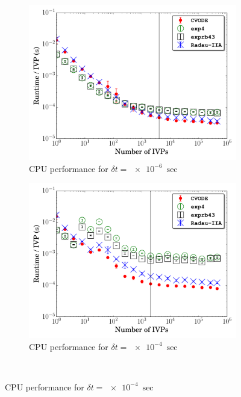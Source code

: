\documentclass[final,twocolumn]{elsarticle}
\begin{document}
\begin{figure}[htb]
  \ifmeasure
  \fontsize{8pt}{10pt}\selectfont
  \fi
  \centering
  \begin{subfigure}{0.49\textwidth}
      \includegraphics[width=\linewidth]{CH4_1e-06_cpu.pdf}
      \caption{CPU performance for $\delta t = \SI{e-6}{\sec}$}
      \label{F:ch4_cpu_perf_small}
  \end{subfigure}
  \begin{subfigure}{0.49\textwidth}
      \includegraphics[width=\linewidth]{CH4_1e-04_cpu.pdf}
      \caption{CPU performance for $\delta t = \SI{e-4}{\sec}$}
      \label{F:ch4_cpu_perf_large}
  \end{subfigure}\\

\end{figure}
\end{document}
